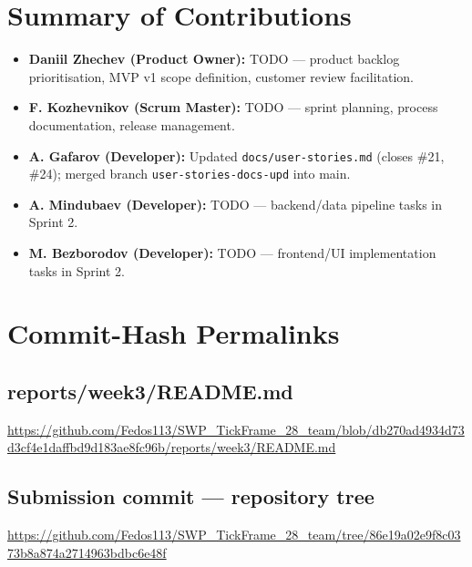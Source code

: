 \documentclass[11pt,a4paper]{article}
\begin{document}
\section{Summary of Contributions}

\begin{itemize}[leftmargin=*]
    \item \textbf{Daniil Zhechev (Product Owner):} TODO — product backlog prioritisation, MVP v1 scope definition, customer review facilitation.
    \item \textbf{F. Kozhevnikov (Scrum Master):} TODO — sprint planning, process documentation, release management.
    \item \textbf{A. Gafarov (Developer):} Updated \texttt{docs/user-stories.md} (closes \#21, \#24); merged branch \texttt{user-stories-docs-upd} into main.
    \item \textbf{A. Mindubaev (Developer):} TODO — backend/data pipeline tasks in Sprint 2.
    \item \textbf{M. Bezborodov (Developer):} TODO — frontend/UI implementation tasks in Sprint 2.
\end{itemize}

\section{Commit-Hash Permalinks}

\subsection{reports/week3/README.md}
\url{https://github.com/Fedos113/SWP_TickFrame_28_team/blob/db270ad4934d73d3cf4e1daffbd9d183ae8fc96b/reports/week3/README.md}

\subsection{Submission commit — repository tree}
\url{https://github.com/Fedos113/SWP_TickFrame_28_team/tree/86e19a02e9f8c0373b8a874a2714963bdbc6e48f}
\end{document}
